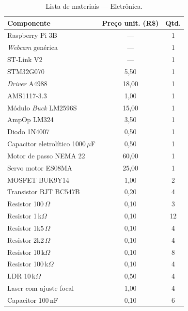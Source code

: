 \begin{table}[H]
\caption{Lista de materiais --- Eletrônica.}
\label{tab:BOM_eletro}
\centering
\renewcommand{\arraystretch}{0.85}
\small
\begin{tabular}{lcc}
\hline
\textbf{Componente} & \textbf{Preço unit. (R\$)} & \textbf{Qtd.} \\
\hline
Raspberry Pi 3B                        & ---   & 1  \\
\textit{Webcam} genérica               & ---   & 1  \\
ST-Link V2                             & ---   & 1  \\
STM32G070                              & 5,50  & 1  \\
\textit{Driver} A4988                  & 18,00 & 1  \\
AMS1117-3.3                            & 1,00  & 1  \\
Módulo \textit{Buck} LM2596S           & 15,00 & 1  \\
AmpOp LM324                            & 3,50  & 1  \\
Diodo 1N4007                           & 0,50  & 1  \\
Capacitor eletrolítico 1000\,$\mu$F    & 0,50  & 1  \\
Motor de passo NEMA 22                 & 60,00 & 1  \\
Servo motor ES08MA                     & 25,00 & 1  \\
MOSFET BUK9Y14                         & 1,00  & 2  \\
Transistor BJT BC547B                  & 0,20  & 4  \\
Resistor 100\,$\Omega$                 & 0,10  & 3  \\
Resistor 1\,k$\Omega$                  & 0,10  & 12 \\
Resistor 1k5\,$\Omega$                 & 0,10  & 4  \\
Resistor 2k2\,$\Omega$                 & 0,10  & 4  \\
Resistor 10\,k$\Omega$                 & 0,10  & 8  \\
Resistor 100\,k$\Omega$                & 0,10  & 4  \\
LDR 10\,k$\Omega$                      & 0,50  & 4  \\
Laser com ajuste focal                 & 1,00  & 4  \\
Capacitor 100\,nF                      & 0,10  & 6  \\

\end{tabular}
\end{table}

